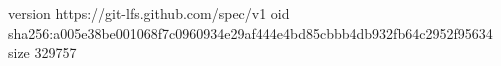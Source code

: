 version https://git-lfs.github.com/spec/v1
oid sha256:a005e38be001068f7c0960934e29af444e4bd85cbbb4db932fb64c2952f95634
size 329757
